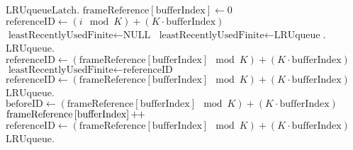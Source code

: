 \begin{@empty}
    \newcommand{\plusplus}{\mathord{\mathord{+}\hspace*{-1pt}\mathord{+}}}
    
    \begin{algorithm}[h!]
        \scriptsize
        \begin{algorithmic}[1]
                \State $\text{LRUqueueLatch}.$
                \State $\text{frameReference}\left[\text{bufferIndex}\right] \gets 0$
                    \State $\text{referenceID} \gets \left(i \mod K\right) + \left(K \cdot \text{bufferIndex}\right)$
                            \State $\text{leastRecentlyUsedFinite} \gets \text{NULL}$
                        \Else
                            \State $\text{leastRecentlyUsedFinite} \gets \text{LRUqueue}$.
                        \EndIf
                    \EndIf
                    \State $\text{LRUqueue}$.
                \EndFor
                \State $\text{referenceID} \gets \left(\text{frameReference}\left[\text{bufferIndex}\right] \mod K\right) + \left(K \cdot \text{bufferIndex}\right)$
                    \State $\text{leastRecentlyUsedFinite} \gets \text{referenceID}$
                \EndIf
                    \State $\text{referenceID} \gets \left(\text{frameReference}\left[\text{bufferIndex}\right] \mod K\right) + \left(K \cdot \text{bufferIndex}\right)$
                    \State $\text{LRUqueue}$.
                \EndIf
                     \State $\text{beforeID} \gets \left(\text{frameReference}\left[\text{bufferIndex}\right] \mod K\right) + \left(K \cdot \text{bufferIndex}\right)$
                     \State $\text{frameReference}\left[\text{bufferIndex}\right]\plusplus$
                     \State $\text{referenceID} \gets \left(\text{frameReference}\left[\text{bufferIndex}\right] \mod K\right) + \left(K \cdot \text{bufferIndex}\right)$
                     \State $\text{LRUqueue}$.

\end{algorithmic}
\end{algorithm}
\end{@empty}
